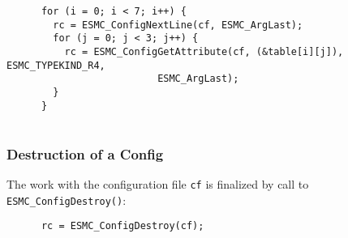  \begin{verbatim}
      for (i = 0; i < 7; i++) {
        rc = ESMC_ConfigNextLine(cf, ESMC_ArgLast);
        for (j = 0; j < 3; j++) {
          rc = ESMC_ConfigGetAttribute(cf, (&table[i][j]), ESMC_TYPEKIND_R4,
                          ESMC_ArgLast);
        }
      }
 
\end{verbatim}
 

  \subsubsection{Destruction of a Config}
 
   The work with the configuration file {\tt cf} is finalized by call to
   {\tt ESMC\_ConfigDestroy()}: 

 \begin{verbatim}
      rc = ESMC_ConfigDestroy(cf);
 
\end{verbatim}

\setlength{\parskip}{\oldparskip}
\setlength{\parindent}{\oldparindent}
\setlength{\baselineskip}{\oldbaselineskip}
